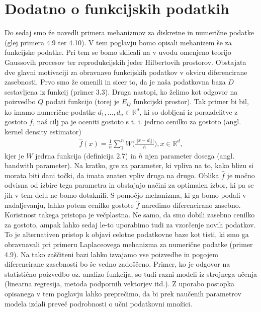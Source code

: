 \documentclass[12pt,a4paper]{amsart}
\theoremstyle{definition} %
\theoremstyle{plain} %
\begin{document}
\section{Dodatno o funkcijskih podatkih}
Do sedaj smo že navedli primera mehanizmov za diskretne in numerične podatke (glej primera 4.9 ter 4.10). V tem poglavju bomo opisali mehanizem še  za funkcijske podatke. Pri tem se bomo sklicali na v uvodu omenjeno teorijo Gaussovih procesov ter reprodukcijskih jeder Hilbertovih prostorov.
\newline
\newline
Obstajata dve glavni motivaciji za obravnavo funkcijskih podatkov v okviru diferencirane zasebnosti. Prvo smo že omenili in sicer to, da je naša podatkovna baza $D$ sestavljena iz funkcij (primer 3.3). Druga nastopi, ko želimo kot odgovor na poizvedbo $Q$ podati funkcijo (torej je $E_Q$ funkcijski prostor). Tak primer bi bil, ko imamo numerične podatke $d_1, ..., d_n \in \mathbb{R}^d$, ki so dobljeni iz porazdelitve z gostoto $f$, naš cilj pa je oceniti gostoto s t. i. jedrno cenilko za gostoto (angl. kernel density estimator) 
\begin{gather*}
\hat{f}(x)=\frac{1}{n}\sum_{1}^{n}W\Big(\frac{||x-d_i||}{h}\Big), x \in \mathbb{R}^d,
\end{gather*}
kjer je $W$ jedrna funkcija (definicija 2.7) in $h$ njen parameter dosega (angl. bandwith parameter). Na kratko, gre za parameter, ki vpliva na to, kako blizu si morata biti dani točki, da imata znaten vpliv druga na drugo. Oblika $\hat{f}$ je močno odvisna od izbire tega parametra in obstajajo načini za optimalen izbor, ki pa se jih v tem delu ne bomo dotaknili. S pomočjo mehanizma, ki ga bomo podali v nadaljevanju, lahko potem cenilko gostote $\hat{f}$ naredimo diferencirano zasebno. Koristnost takega pristopa je večplastna. Ne samo, da smo dobili zasebno cenilko za gostoto, ampak lahko sedaj le-to uporabimo tudi za vzorčenje novih podatkov. To je alternativen pristop k objavi celotne podatkovne baze kot tisti, ki smo ga obravnavali pri primeru Laplaceovega mehanizma za numerične podatke (primer 4.9). Na tako zaščiteni bazi lahko izvajamo vse poizvedbe in pogojem diferencirane zasebnosti bo še vedno zadoščeno. Primer, ko je odgovor na statistično poizvedbo oz. analizo funkcija, so tudi razni modeli iz strojnega učenja (linearna regresija, metoda podpornih vektorjev itd.). Z uporabo postopka opisanega v tem poglavju lahko preprečimo, da bi prek naučenih parametrov modela izdali preveč podrobnosti o učni podatkovni množici.
\newline
\end{document}
